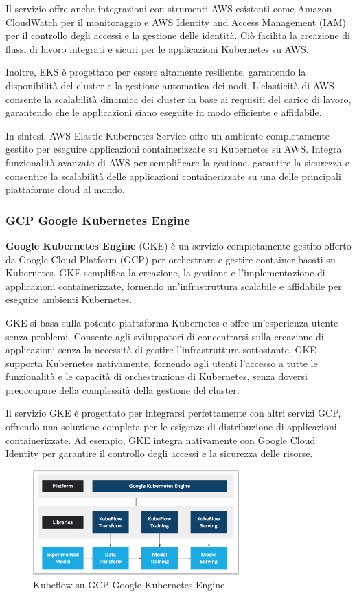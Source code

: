 Il servizio offre anche integrazioni con strumenti AWS esistenti come Amazon CloudWatch per il monitoraggio e AWS Identity and Access Management (IAM) per il controllo degli accessi e la gestione delle identità. Ciò facilita la creazione di flussi di lavoro integrati e sicuri per le applicazioni Kubernetes su AWS.

Inoltre, EKS è progettato per essere altamente resiliente, garantendo la disponibilità del cluster e la gestione automatica dei nodi. L'elasticità di AWS consente la scalabilità dinamica dei cluster in base ai requisiti del carico di lavoro, garantendo che le applicazioni siano eseguite in modo efficiente e affidabile.

In sintesi, AWS Elastic Kubernetes Service offre un ambiente completamente gestito per eseguire applicazioni containerizzate su Kubernetes su AWS. Integra funzionalità avanzate di AWS per semplificare la gestione, garantire la sicurezza e consentire la scalabilità delle applicazioni containerizzate su una delle principali piattaforme cloud al mondo.

\subsubsection{GCP Google Kubernetes Engine}

\textbf{Google Kubernetes Engine} (GKE) è un servizio completamente gestito offerto da Google Cloud Platform (GCP) per orchestrare e gestire container basati su Kubernetes. GKE semplifica la creazione, la gestione e l'implementazione di applicazioni containerizzate, fornendo un'infrastruttura scalabile e affidabile per eseguire ambienti Kubernetes.

GKE si basa sulla potente piattaforma Kubernetes e offre un'esperienza utente senza problemi. Consente agli sviluppatori di concentrarsi sulla creazione di applicazioni senza la necessità di gestire l'infrastruttura sottostante. GKE supporta Kubernetes nativamente, fornendo agli utenti l'accesso a tutte le funzionalità e le capacità di orchestrazione di Kubernetes, senza doversi preoccupare della complessità della gestione del cluster.

Il servizio GKE è progettato per integrarsi perfettamente con altri servizi GCP, offrendo una soluzione completa per le esigenze di distribuzione di applicazioni containerizzate. Ad esempio, GKE integra nativamente con Google Cloud Identity per garantire il controllo degli accessi e la sicurezza delle risorse.

\begin{figure}[h]
    \centering
    \includegraphics[width=300px]{figures/ch3/kubeflow-gcp.png}
    \caption[Kubeflow su GCP Google Kubernetes Engine]{Kubeflow su GCP Google Kubernetes Engine}
    \label{fig:cha3:kf-gcp}
\end{figure}

